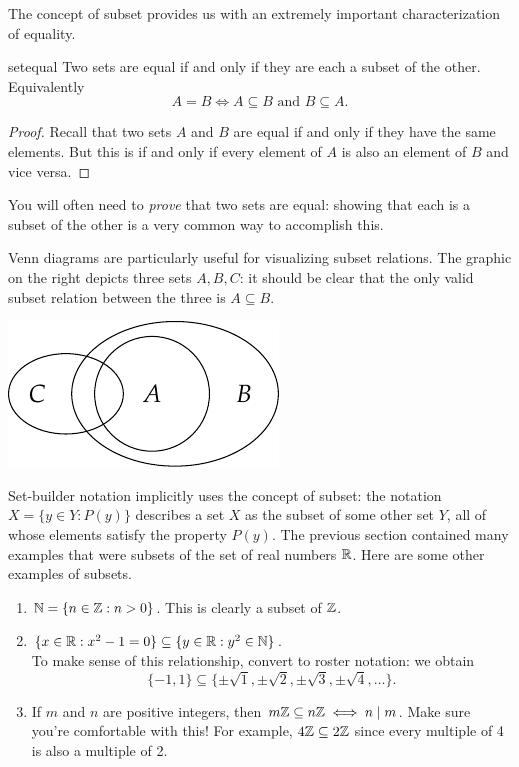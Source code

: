  The concept of subset provides us with an extremely important characterization of equality.

\begin{thm}{}{setequal}
Two sets are equal if and only if they are each a subset of the other. Equivalently
\[A=B\iff A\subseteq B\text{ and }B\subseteq A.\]
\end{thm}

\begin{proof}
Recall that two sets $A$ and $B$ are equal if and only if they have the same elements. But this is if and only if every element of $A$ is also an element of $B$ and vice versa.
\end{proof}

 You will often need to \emph{prove} that two sets are equal: showing that each is a subset of the other is a very common way to accomplish this.

\begin{minipage}[t]{0.63\linewidth}\vspace{0pt}
Venn diagrams are particularly useful for visualizing subset relations. The graphic on the right depicts three sets $A,B,C$: it should be clear that the only valid subset relation between the three is $A\subseteq B$.
\end{minipage}\qquad
\begin{minipage}[t]{0.26\linewidth}\vspace{0pt}
\includegraphics[scale=1]{sets-02-vennsubset}
\end{minipage}\par

Set-builder notation implicitly uses the concept of subset: the notation $X=\{y\in Y:P(y)\}$ describes a set $X$ as the subset of some other set $Y$, all of whose elements satisfy the property $P(y)$. The previous section contained many examples that were subsets of the set of real numbers $\mathbb{R}$. Here are some other examples of subsets.

\begin{examples}{}{}
\begin{enumerate}
  \item $\mathbb{N}=\{n\in\mathbb{Z}:n>0\}$. This is clearly a subset of $\mathbb{Z}$.
  \item $\{x\in\mathbb{R}:x^2-1=0\}\subseteq \{y\in\mathbb{R}:y^2\in\mathbb{N}\}$.\\
  To make sense of this relationship, convert to roster notation: we obtain
  \[\{-1,1\}\subseteq\{\pm\sqrt 1,\pm\sqrt 2,\pm\sqrt 3,\pm\sqrt 4,\ldots\}.\]
  \item If $m$ and $n$ are positive integers, then $m\mathbb{Z}\subseteq n\mathbb{Z}\iff n\mid m$. Make sure you're comfortable with this! For example, $4\mathbb{Z}\subseteq 2\mathbb{Z}$ since every multiple of 4 is also a multiple of 2.
\end{enumerate}
\end{examples}

